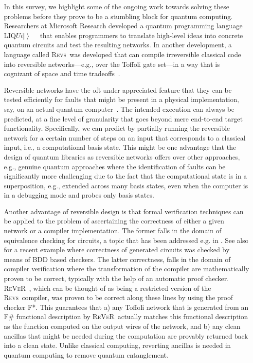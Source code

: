\documentclass[conference]{IEEEtran}
\newcommand{\ket}[1]{\left| #1\right\rangle}        %
\newcommand{\Liquid}{LIQ$Ui\ket{}$\ }
\newcommand{\REVS}{{\textsc{Revs}}}
\newcommand{\REVER}{{\textsc{ReVeR}}}
\begin{document}
In this survey, we highlight some of the ongoing work towards solving these problems before they prove to be a stumbling block for quantum computing. Researchers at Microsoft Research developed a quantum programming language \Liquid~\cite{WS:2014} that enables programmers to translate high-level ideas into concrete quantum circuits and test the resulting networks. In another development, a language called \REVS~was developed that can compile irreversible classical code into reversible networks---e.g., over the Toffoli gate set---in a way that is cognizant of space and time tradeoffs~\cite{PRS15}. 

Reversible networks have the oft under-appreciated feature that they can be tested efficiently for faults that might be present in a physical implementation, say, on an actual quantum computer~\cite{HRS16}. The intended execution can always be predicted, at a fine level of granularity that goes beyond mere end-to-end target functionality.  Specifically, we can predict by partially running the reversible network for a certain number of steps on an input that corresponds to a classical input, i.e., a computational basis state. This might be one advantage that the design of quantum libraries as reversible networks offers over other approaches, e.g., genuine quantum approaches where the identification of faults can be significantly more challenging due to the fact that the computational state is in a superposition, e.g., extended across many basis states, even when the computer is in a debugging mode and probes only basis states. 

Another advantage of reversible design is that formal verification techniques can be applied to the problem of ascertaining the correctness of either a given network or a compiler implementation. The former falls in the domain of equivalence checking for circuits, a topic that has been addressed e.g. in \cite{VMH:2007}. See also \cite{SRWD:2017} for a recent example where correctness of generated circuits was checked by means of BDD based checkers.  The latter correctness, falls in the domain of compiler verification where the transformation of the compiler are mathematically proven to be correct, typically with the help of an automatic proof checker. \REVER~\cite{ARS16}, which can be thought of as being a restricted version of the \REVS~compiler, was proven to be correct along these lines by using the proof checker F*.  This guarantees that a) any Toffoli network that is generated from an F\# functional description by \REVER~actually matches this functional description as the function computed on the output wires of the network, and b) any clean ancillas that might be needed during the computation are provably returned back into a clean state. Unlike classical computing, reverting ancillas is needed in quantum computing to remove quantum entanglement.
\end{document}

